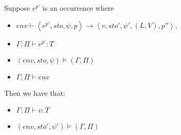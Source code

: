 \documentclass[../../master.tex]{subfiles}
\begin{document}
\begin{theorem}
	Suppose $e^{p'}$ is an occurrence where
	\begin{itemize}
		\item $env\vdash\left\langle e^{p'},sto,\psi,p\right\rangle\rightarrow\left\langle v,sto',\psi',(L,V),p''\right\rangle$,
		\item $\Gamma;\Pi\vdash e^{p'} : T$
		\item $(env,sto,\psi)\models(\Gamma,\Pi)$
		\item $\Gamma;\Pi\vdash env$
	\end{itemize}
	Then we have that:
	\begin{itemize}
		\item $\Gamma;\Pi\vdash v:T$
		\item $(env,sto',\psi')\models(\Gamma,\Pi)$
	\end{itemize}
\end{theorem}
\end{document}
